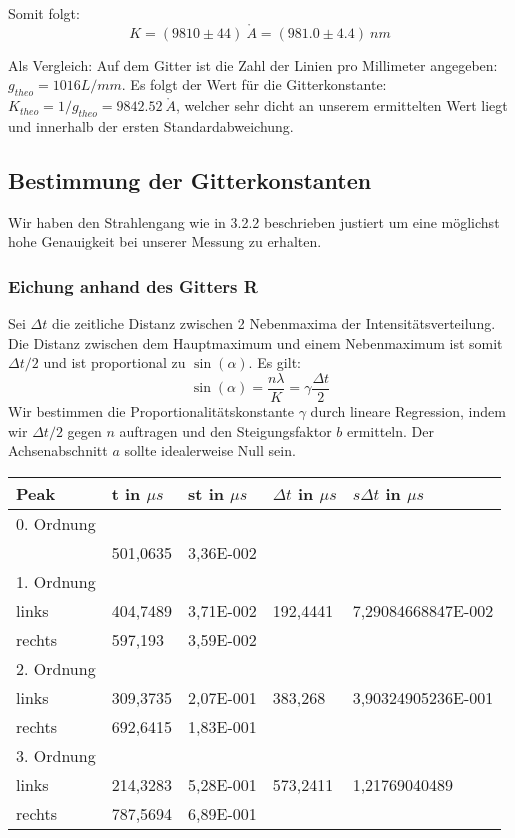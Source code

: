 Somit folgt: $$\boxed{K=(9810 \pm 44) \ \mathring A = (981.0 \pm 4.4) \ nm}$$

Als Vergleich: Auf dem Gitter ist die Zahl der Linien pro Millimeter angegeben: \\ $g_{theo}=1016 L/mm$. Es folgt der Wert f\"ur die Gitterkonstante: $K_{theo} = 1/g_{theo} = 9842.52 \ \mathring A$, welcher sehr dicht an unserem ermittelten Wert liegt und innerhalb der ersten Standardabweichung.

\subsection{Bestimmung der Gitterkonstanten}

Wir haben den Strahlengang wie in 3.2.2 beschrieben justiert um eine m\"oglichst hohe Genauigkeit bei unserer Messung zu erhalten.

\subsubsection{Eichung anhand des Gitters R}

Sei $\Delta t$ die zeitliche Distanz zwischen 2 Nebenmaxima der Intensit\"atsverteilung. Die Distanz zwischen dem Hauptmaximum und einem Nebenmaximum ist somit $\Delta t/2$ und ist proportional zu $\sin(\alpha)$. Es gilt: $$\sin(\alpha) = \frac{n\lambda}{K} = \gamma \frac{\Delta t}{2}$$
Wir bestimmen die Proportionalit\"atskonstante $\gamma$ durch lineare Regression, indem wir $\Delta t/2$ gegen $n$ auftragen und den Steigungsfaktor $b$ ermitteln. Der Achsenabschnitt $a$ sollte idealerweise Null sein.

\begin{center}
\begin{tabular}{lllll}
\toprule
Peak & t in $\mu s$ & st in $\mu s$ & $\Delta t$ in $\mu s$ & $s\Delta t$ in $\mu s$ \\
\midrule
0. Ordnung \\
 & 501,0635 & 3,36E-002\\
\midrule
1. Ordnung\\
links & 404,7489 & 3,71E-002 & 192,4441 & 7,29084668847E-002\\
rechts & 597,193 & 3,59E-002\\
\midrule
2. Ordnung\\ 
links & 309,3735 & 2,07E-001 & 383,268 & 3,90324905236E-001\\
rechts & 692,6415 & 1,83E-001\\
\midrule
3. Ordnung\\ 
links & 214,3283 & 5,28E-001 & 573,2411 & 1,21769040489\\
rechts & 787,5694 & 6,89E-001\\
\bottomrule
\end{tabular}
\end{center}

